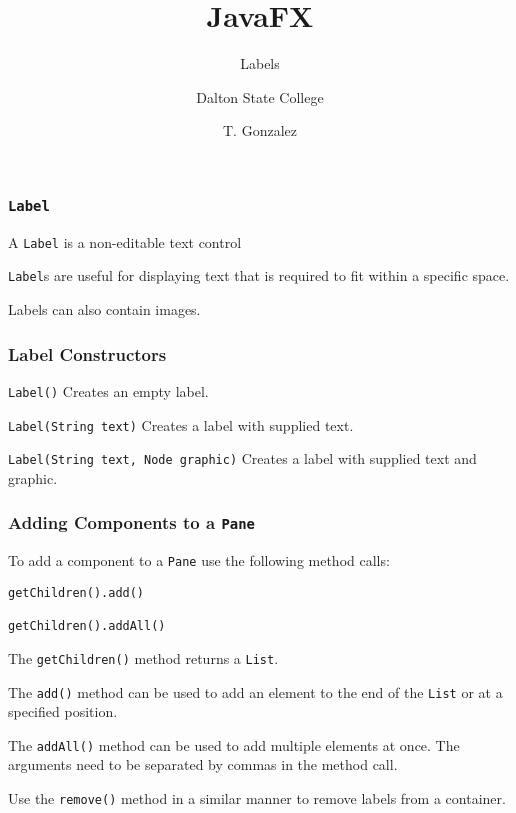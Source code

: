 \documentclass{beamer}
\title[Labels]{JavaFX}
\subtitle{Labels} %
\author[]{Dalton State College}
\date[T. Gonzalez]{T. Gonzalez}
\newcommand{\mil}[1]{\texttt{#1}}
\begin{document}
\begin{frame}

	\titlepage
	
\end{frame}

\begin{frame}
    
    \frametitle{\mil{Label}}
    
    A \mil{Label} is a non-editable text control
    
    \bigskip
    
    \mil{Label}s are useful for displaying text that is required to fit within a specific space.
    
    \bigskip
    
   Labels can also contain images.  

\end{frame}
	
\begin{frame}[fragile]

	\frametitle{Label Constructors}
	
    \mil{Label()}  Creates an empty label.
    
    \bigskip
    
    \mil{Label(String text)} Creates a label with supplied text.
    
    \bigskip
    
    \mil{Label(String text, Node graphic)}  Creates a label with supplied text and graphic.
	
\end{frame}

\begin{frame}[fragile]

    \frametitle{Adding Components to a \mil{Pane}}
    
    To add a component to a \mil{Pane} use the following method calls:
    
\begin{verbatim}
getChildren().add() 
        
getChildren().addAll() 
\end{verbatim}

\bigskip

The \mil{getChildren()} method returns a \mil{List}.

\bigskip

The \mil{add()} method can be used to add an element to the end of the \mil{List} or at a specified position.

\bigskip

The \mil{addAll()} method can be used to add multiple elements at once.  The arguments need to be separated by commas in the method call.

\bigskip
   
Use the \mil{remove()} method in a similar manner to remove labels from a container.
\end{frame}
\end{document}
